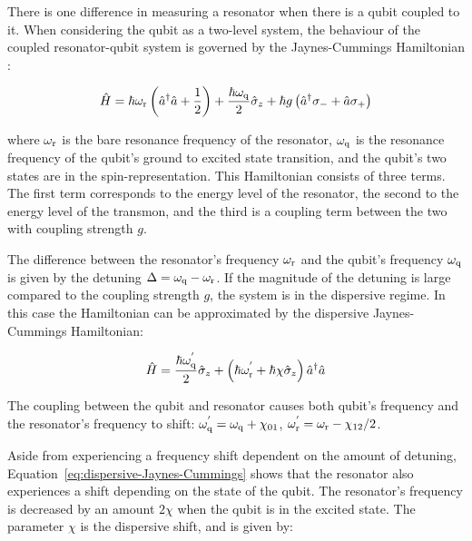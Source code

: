         There is one difference in measuring a resonator when there is a qubit coupled to it. When considering the qubit as a two-level system, the behaviour of the coupled resonator-qubit system is governed by the Jaynes-Cummings Hamiltonian \cite{Reed}:

        \begin{equation}
          \hat{H} = \hbar \omega_\text{r}\left(\hat{a}^\dagger \hat{a} + \frac{1}{2} \right) + \frac{\hbar \omega_\text{q}}{2}\hat{\sigma}_z + \hbar g \left(\hat{a}^\dagger \sigma_{-} + \hat{a}\sigma_{+}\right)
          \label{eq:Jaynes-Cummings}
        \end{equation}

        where $\omega_\text{r}$ is the bare resonance frequency of the resonator, $\omega_\text{q}$ is the resonance frequency of the qubit's ground to excited state transition, and the qubit's two states are in the spin-representation. This Hamiltonian consists of three terms. The first term corresponds to the energy level of the resonator, the second to the energy level of the transmon, and the third is a coupling term between the two with coupling strength $g$.

        The difference between the resonator's frequency $\omega_\text{r}$ and the qubit's frequency $\omega_\text{q}$ is given by the detuning $\Delta = \omega_\text{q} - \omega_\text{r}$. If the magnitude of the detuning is large compared to the coupling strength $g$, the system is in the dispersive regime. In this case the Hamiltonian can be approximated by the dispersive Jaynes-Cummings Hamiltonian:

        \begin{equation}
          \hat{H} = \frac{\hbar \omega_\text{q}^{'}}{2} \hat{\sigma}_z +  \left(\hbar \omega_\text{r}^{'} + \hbar \chi \hat{\sigma}_z\right) \hat{a}^\dagger \hat{a}
          \label{eq:dispersive-Jaynes-Cummings}
        \end{equation}

        The coupling between the qubit and resonator causes both qubit's frequency and the resonator's frequency to shift: $\omega_\text{q}^{'} = \omega_\text{q} + \chi_{01}$, $\omega_\text{r}^{'}=\omega_\text{r} - \chi_{12}/2$.

        Aside from experiencing a frequency shift dependent on the amount of detuning, Equation~\ref{eq:dispersive-Jaynes-Cummings} shows that the resonator also experiences a shift depending on the state of the qubit. The resonator's frequency is decreased by an amount $2 \chi$ when the qubit is in the excited state. The parameter $\chi$ is the dispersive shift, and is given by:

